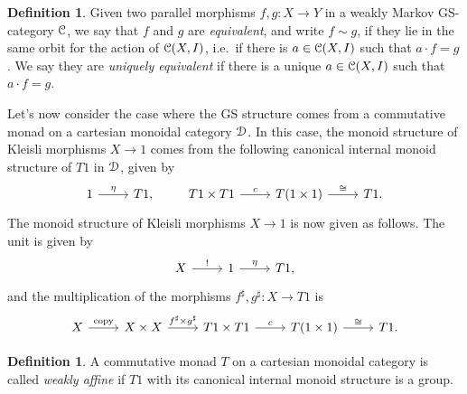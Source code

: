 \documentclass[a4paper,UKenglish,numberwithinsect,cleveref, autoref, thm-restate]{lipics-v2021}
\theoremstyle{plain} %
\theoremstyle{definition} %
\newtheorem{mydefinition}[mytheorem]{Definition}
\begin{document}
\begin{mydefinition}
 Given two parallel morphisms $f,g:X\to Y$ in a weakly Markov GS-category $\mathcal{C}$, we say that $f$ and $g$ are \emph{equivalent}, and write $f\sim g$, if they lie in the same orbit for the action of $\mathcal{C}(X,I)$, i.e.~if there is $a\in \mathcal{C}(X,I)$ such that $a\cdot f=g$.
 We say they are \emph{uniquely equivalent} if there is a unique $a\in \mathcal{C}(X,I)$ such that $a\cdot f=g$.
\end{mydefinition}


Let's now consider the case where the GS structure comes from a commutative monad on a cartesian monoidal category $\mathcal{D}$. 
In this case, the monoid structure of Kleisli morphisms $X\to 1$ comes from the following canonical internal monoid structure of $T1$ in $\mathcal{D}$, given by 
 \[
 \begin{tikzcd}
  1 \ar{r}{\eta} & T1 ,
 \end{tikzcd}
 \qquad
 \begin{tikzcd}
  T1 \times T1 \ar{r}{c} & T(1\times 1) \ar{r}{\cong} & T1 .
 \end{tikzcd}
 \]
 The monoid structure of Kleisli morphisms $X\to 1$ is now given as follows. The unit is given by
 \[
 \begin{tikzcd}
  X \ar{r}{!} & 1 \ar{r}{\eta} & T1 ,
 \end{tikzcd}
 \]
 and the multiplication of the morphisms $f^\sharp,g^\sharp:X\to T1$ is
 \[
 \begin{tikzcd}
  X \ar{r}{\mathrm{copy}} & X\times X \ar{r}{f^\sharp\times g^\sharp} &
  T1 \times T1 \ar{r}{c} & T(1\times 1) \ar{r}{\cong} & T1 .
 \end{tikzcd}
 \]




\begin{mydefinition}
 A commutative monad $T$ on a cartesian monoidal category is called \emph{weakly affine} if $T1$ with its canonical internal monoid structure is a group.
\end{mydefinition}
\end{document}
